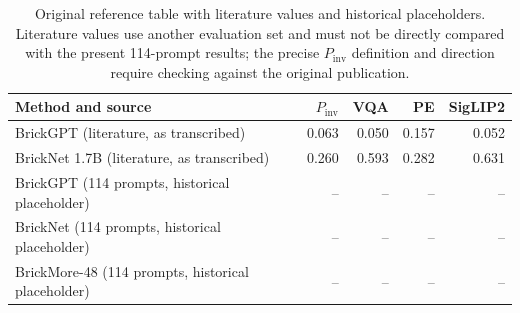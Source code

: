 \begin{table}[t]\centering\scriptsize
\begin{tabular}{lrrrr}\toprule
Method and source & $P_{\mathrm{inv}}$ & VQA & PE & SigLIP2 \\ \midrule
BrickGPT (literature, as transcribed) & 0.063 & 0.050 & 0.157 & 0.052 \\
BrickNet 1.7B (literature, as transcribed) & 0.260 & 0.593 & 0.282 & 0.631 \\
BrickGPT (114 prompts, historical placeholder) & -- & -- & -- & -- \\
BrickNet (114 prompts, historical placeholder) & -- & -- & -- & -- \\
BrickMore-48 (114 prompts, historical placeholder) & -- & -- & -- & -- \\
\bottomrule\end{tabular}
\caption{Original reference table with literature values and historical placeholders. Literature values use another evaluation set and must not be directly compared with the present 114-prompt results; the precise $P_{\mathrm{inv}}$ definition and direction require checking against the original publication.}
\end{table}

